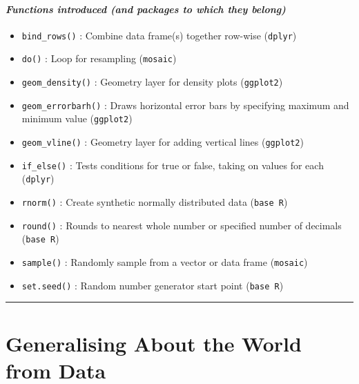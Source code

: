 \documentclass[
]{book}
\providecommand{\tightlist}{%
  \setlength{\itemsep}{0pt}\setlength{\parskip}{0pt}}
\begin{document}
\hypertarget{functions-introduced-and-packages-to-which-they-belong-4}{%
\paragraph*{\texorpdfstring{\emph{Functions introduced (and packages to which they belong)}}{Functions introduced (and packages to which they belong)}}\label{functions-introduced-and-packages-to-which-they-belong-4}}

\begin{itemize}
\tightlist
\item
  \texttt{bind\_rows()} : Combine data frame(s) together row-wise (\texttt{dplyr})
\item
  \texttt{do()} : Loop for resampling (\texttt{mosaic})
\item
  \texttt{geom\_density()} : Geometry layer for density plots (\texttt{ggplot2})
\item
  \texttt{geom\_errorbarh()} : Draws horizontal error bars by specifying maximum and minimum value (\texttt{ggplot2})
\item
  \texttt{geom\_vline()} : Geometry layer for adding vertical lines (\texttt{ggplot2})
\item
  \texttt{if\_else()} : Tests conditions for true or false, taking on values for each (\texttt{dplyr})
\item
  \texttt{rnorm()} : Create synthetic normally distributed data (\texttt{base\ R})
\item
  \texttt{round()} : Rounds to nearest whole number or specified number of decimals (\texttt{base\ R})
\item
  \texttt{sample()} : Randomly sample from a vector or data frame (\texttt{mosaic})
\item
  \texttt{set.seed()} : Random number generator start point (\texttt{base\ R})
\end{itemize}

\begin{center}\rule{0.5\linewidth}{0.5pt}\end{center}

\hypertarget{generalising-about-the-world-from-data}{%
\section{Generalising About the World from Data}\label{generalising-about-the-world-from-data}}
\end{document}
